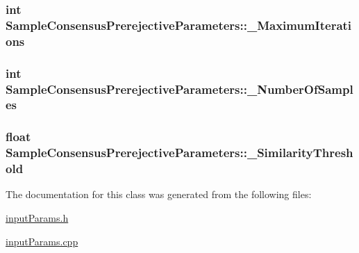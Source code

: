 \hypertarget{classSampleConsensusPrerejectiveParameters_ae33e3c6665cb269e46e5cd0fe184431f}{
\subsubsection[{\-\_\-\-Maximum\-Iterations}]{\setlength{\rightskip}{0pt plus 5cm}int Sample\-Consensus\-Prerejective\-Parameters\-::\-\_\-\-Maximum\-Iterations\hspace{0.3cm}{\ttfamily [private]}}}\label{classSampleConsensusPrerejectiveParameters_ae33e3c6665cb269e46e5cd0fe184431f}
\hypertarget{classSampleConsensusPrerejectiveParameters_afe207e4a999ac1d22efdaa5992b107ae}{
\subsubsection[{\-\_\-\-Number\-Of\-Samples}]{\setlength{\rightskip}{0pt plus 5cm}int Sample\-Consensus\-Prerejective\-Parameters\-::\-\_\-\-Number\-Of\-Samples\hspace{0.3cm}{\ttfamily [private]}}}\label{classSampleConsensusPrerejectiveParameters_afe207e4a999ac1d22efdaa5992b107ae}
\hypertarget{classSampleConsensusPrerejectiveParameters_a33708a718166fa812f2b88814e5a3f8b}{
\subsubsection[{\-\_\-\-Similarity\-Threshold}]{\setlength{\rightskip}{0pt plus 5cm}float Sample\-Consensus\-Prerejective\-Parameters\-::\-\_\-\-Similarity\-Threshold\hspace{0.3cm}{\ttfamily [private]}}}\label{classSampleConsensusPrerejectiveParameters_a33708a718166fa812f2b88814e5a3f8b}


The documentation for this class was generated from the following files\-:\begin{DoxyCompactItemize}
\item 
\hyperlink{inputParams_8h}{input\-Params.\-h}\item 
\hyperlink{inputParams_8cpp}{input\-Params.\-cpp}\end{DoxyCompactItemize}
